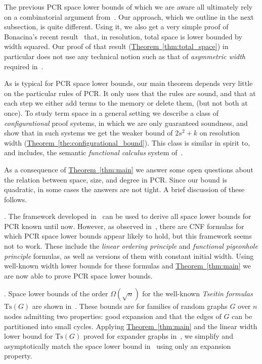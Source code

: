\documentclass[11pt]{article}
\numberwithin{equation}{section}
\theoremstyle{definition}
\theoremstyle{plain}
\newcommand{\expref}[2]{\hyperref[#2]{#1~\ref{#2}}}
\newcommand\Tse{\mathrm{Ts}}
\begin{document}
The previous PCR space lower bounds of which we are aware
all ultimately rely on a combinatorial argument from~\cite{ABRW}. 
Our approach, which we outline in the next subsection,
is quite different.
Using it, we also get a very simple proof of Bonacina's recent 
result~\cite{DBLP:conf/icalp/Bonacina16} that, in resolution, total space is lower bounded by width squared.  Our proof of that result (\expref{Theorem}{thm:total_space}) in particular
does not use any technical notion such as that of \emph{asymmetric width} required 
in~\cite{DBLP:conf/icalp/Bonacina16}.

As is typical for PCR space lower bounds, our main theorem depends very little
on the particular rules of PCR. It only uses that the rules are sound, and 
that at each step we either add terms to the memory or delete them,
(but not both at once). 
To study term space in a general setting we
describe a class of \emph{configurational} proof systems,
in which we are only guaranteed soundness,
and show that in such systems we get the weaker bound of $2s^2+k$
on resolution width (\expref{Theorem}{the:configurational_bound}).
This class is similar in spirit to, and includes, the semantic
\emph{functional calculus} system of~\cite{ABRW}.
     
As a consequence of \expref{Theorem}{thm:main} we answer 
some open questions about the relation between space, size, and degree in PCR. Since our bound is quadratic, 
in some cases the answers are not tight. A brief discussion of these follows.

\smallskip 
{}.
The framework developed in~\cite{DBLP:journals/jacm/BonacinaG15} can be used to derive all space lower bounds for PCR known until now. 
However, as observed in~\cite{DBLP:conf/icalp/FilmusLMNV13}, there are CNF formulas 
for which PCR space lower bounds appear likely to hold, 
but this framework seems not to work.  
These include the \emph{linear ordering principle}
and \emph{functional pigeonhole principle} formulas, as well as
versions of them  with constant initial width.  Using well-known width lower bounds for these formulas \cite{DBLP:journals/cc/BonetG01,DBLP:journals/tocl/GalesiL10,DBLP:journals/tcs/Razborov03,DBLP:journals/siamcomp/SegerlindBI04,DBLP:conf/coco/MiksaN15}  and \expref{Theorem}{thm:main} we are 
now able to prove PCR space lower bounds. 

\smallskip 
{}.
Space lower bounds of the order $\Omega(\sqrt{n})$ for the well-known \emph{Tseitin formulas} $\Tse(G)$ are shown
in~\cite{DBLP:conf/icalp/FilmusLMNV13}. These bounds are for families of random graphs $G$ over $n$
nodes admitting two properties:  good expansion and that the edges of $G$  can be partitioned into small cycles. Applying \expref{Theorem}{thm:main} and the linear width lower bound  for $\Tse(G)$ proved for expander graphs in~\cite{DBLP:journals/jacm/Ben-SassonW01}, we simplify and asymptotically match the space lower bound in~\cite{DBLP:conf/icalp/FilmusLMNV13} using only an
expansion property.
 
\end{document}
